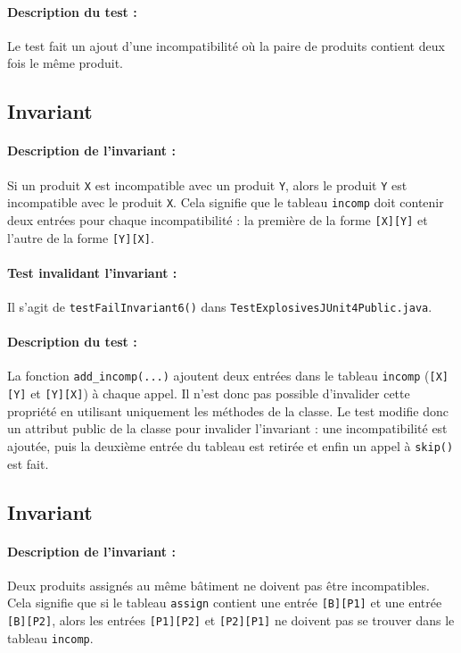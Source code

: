 \documentclass{article}
\begin{document}
\paragraph{Description du test :} Le test fait un ajout d'une incompatibilité où la paire de produits contient deux fois le même produit.

\subsection{Invariant }

\paragraph{Description de l'invariant :} Si un produit \texttt{X} est incompatible avec un produit \texttt{Y}, alors le produit \texttt{Y} est incompatible avec le produit \texttt{X}. Cela signifie que le tableau \texttt{incomp} doit contenir deux entrées pour chaque incompatibilité : la première de la forme \texttt{[X][Y]} et l'autre de la forme \texttt{[Y][X]}.

\vspace{-0.2cm}
\paragraph{Test invalidant l'invariant :} Il s'agit de \texttt{testFailInvariant6()} dans \texttt{TestExplosivesJUnit4Public.java}.

\vspace{-0.2cm}
\paragraph{Description du test :} La fonction \texttt{add\_incomp(...)} ajoutent deux entrées dans le tableau \texttt{incomp} (\texttt{[X][Y]} et \texttt{[Y][X]}) à chaque appel. Il n'est donc pas possible d'invalider cette propriété en utilisant uniquement les méthodes de la classe. Le test modifie donc un attribut public de la classe pour invalider l'invariant : une incompatibilité est ajoutée, puis la deuxième entrée du tableau est retirée et enfin un appel à \texttt{skip()} est fait.

\subsection{Invariant }

\paragraph{Description de l'invariant :} Deux produits assignés au même bâtiment ne doivent pas être incompatibles. Cela signifie que si le tableau \texttt{assign} contient une entrée \texttt{[B][P1]} et une entrée \texttt{[B][P2]}, alors les entrées \texttt{[P1][P2]} et \texttt{[P2][P1]} ne doivent pas se trouver dans le tableau \texttt{incomp}.
\end{document}
